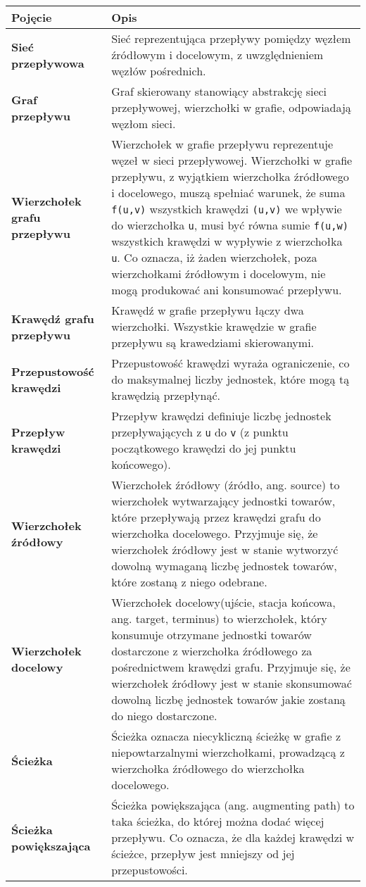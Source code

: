 \documentclass[10pt]{dokument-tiwo}
\begin{document}
\begin{tabular}{@{} >{\bfseries}p{} @{\hspace{0.02\textwidth}} p{} @{}}
\toprule
Pojęcie & \bfseries{Opis} \\
\toprule
Sieć przepływowa  &
Sieć reprezentująca przepływy pomiędzy węzłem źródłowym i docelowym, z
uwzględnieniem węzłów pośrednich.\\
\midrule
Graf przepływu &
Graf skierowany stanowiący abstrakcję sieci przepływowej, wierzchołki w grafie,
odpowiadają węzłom sieci.\\
\midrule
Wierzchołek grafu przepływu &
Wierzchołek w grafie przepływu reprezentuje węzeł w sieci przepływowej.
Wierzchołki w grafie przepływu, z wyjątkiem wierzchołka źródłowego i docelowego,
muszą spełniać warunek, że suma \texttt{f(u,v)} wszystkich krawędzi
\texttt{(u,v)} we wpływie do wierzchołka \texttt{u}, musi być równa sumie
\texttt{f(u,w)} wszystkich krawędzi w wypływie z wierzchołka \texttt{u}. Co
oznacza, iż żaden wierzchołek, poza wierzchołkami źródłowym i docelowym, nie
mogą produkować ani konsumować przepływu.\\
\midrule
Krawędź grafu przepływu &
Krawędź w grafie przepływu łączy dwa wierzchołki. Wszystkie krawędzie w grafie
przepływu są krawedziami skierowanymi.\\
\midrule
Przepustowość krawędzi &
Przepustowość krawędzi wyraża ograniczenie, co do maksymalnej liczby jednostek,
które mogą tą krawędzią przepłynąć.\\
\midrule
Przepływ krawędzi &
Przepływ krawędzi definiuje liczbę jednostek przepływających z \texttt{u} do
\texttt{v} (z punktu początkowego krawędzi do jej punktu końcowego).\\
\midrule
Wierzchołek źródłowy &
Wierzchołek źródłowy (źródło, ang. source) to wierzchołek wytwarzający jednostki
towarów, które przepływają przez krawędzi grafu do wierzchołka docelowego.
Przyjmuje się, że wierzchołek źródłowy jest w stanie wytworzyć dowolną wymaganą
liczbę jednostek towarów, które zostaną z niego odebrane.\\
\midrule
Wierzchołek docelowy &
Wierzchołek docelowy(ujście, stacja końcowa, ang. target, terminus) to
wierzchołek, który konsumuje otrzymane jednostki towarów dostarczone z
wierzchołka źródłowego za pośrednictwem krawędzi grafu. Przyjmuje się, że
wierzchołek źródłowy jest w stanie skonsumować dowolną liczbę jednostek towarów
jakie zostaną do niego dostarczone.\\
\midrule
Ścieżka &
Ścieżka oznacza niecykliczną ścieżkę w grafie z niepowtarzalnymi wierzchołkami,
prowadzącą z wierzchołka źródłowego do wierzchołka docelowego.\\
\midrule
Ścieżka powiększająca &
Ścieżka powiększająca (ang. augmenting path) to taka ścieżka, do której można
dodać więcej przepływu. Co oznacza, że dla każdej krawędzi w ścieżce, przepływ
jest mniejszy od jej przepustowości.\\
\bottomrule
\end{tabular}
\end{document}
